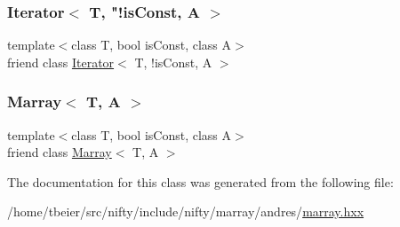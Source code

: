 \subsubsection{\texorpdfstring{Iterator$<$ T, "!is\+Const, A $>$}{Iterator< T, !isConst, A >}}
{\footnotesize\ttfamily template$<$class T, bool is\+Const, class A$>$ \\
friend class \hyperlink{classandres_1_1Iterator}{Iterator}$<$ T, !is\+Const, A $>$\hspace{0.3cm}{\ttfamily [friend]}}

\mbox{\label{classandres_1_1Iterator_ad7bf464de20a2e1bbc38644d8615fba8}} 
\subsubsection{\texorpdfstring{Marray$<$ T, A $>$}{Marray< T, A >}}
{\footnotesize\ttfamily template$<$class T, bool is\+Const, class A$>$ \\
friend class \hyperlink{classandres_1_1Marray}{Marray}$<$ T, A $>$\hspace{0.3cm}{\ttfamily [friend]}}



The documentation for this class was generated from the following file\+:\begin{DoxyCompactItemize}
\item 
/home/tbeier/src/nifty/include/nifty/marray/andres/\hyperlink{andres_2marray_8hxx}{marray.\+hxx}\end{DoxyCompactItemize}
